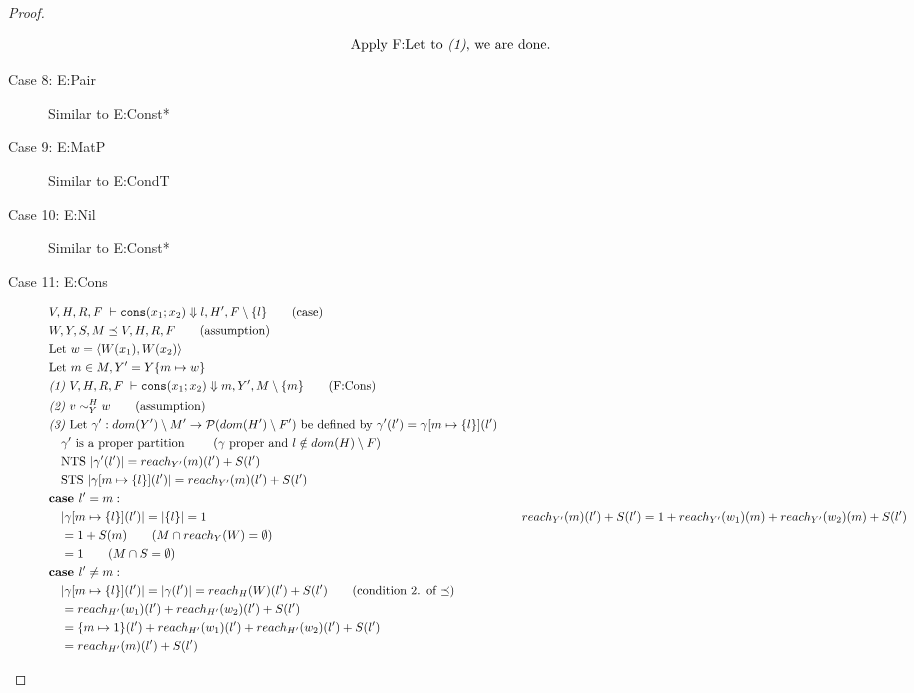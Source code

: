 \documentclass[11pt]{article}
\newcommand{\veq}[4]{#3 \sim^{#1}_{#2} #4}
\theoremstyle{definition}
\begin{document}
\begin{proof}
\begin{description}
\begin{align*}
		&\text{Apply F:Let to \emph{(1)}, we are done.}
  \end{align*}
	\item[Case 8: E:Pair]
  Similar to E:Const*
  \item[Case 9: E:MatP]
  Similar to E:CondT
  \item[Case 10: E:Nil]
  Similar to E:Const*
  \item[Case 11: E:Cons]
  \begin{align*}
		&V,H,R,F \; \vdash \consexcst{x_1}{x_2} \Downarrow l,H' ,F \setminus \{l\} \tag{case}\\
		&W,Y,S,M \preceq V,H,R,F \tag{assumption}\\
		&\text{Let } w = \pairexcst{W(x_1)}{W(x_2)}\\
		&\text{Let } m \in M, Y' = Y\{m \mapsto w\}\\
		&\emph{(1) }V,H,R,F \; \vdash
			\consexcst{x_1}{x_2} \Downarrow m,Y' ,M \setminus \{m\} \tag{F:Cons}\\
		&\emph{(2) } \veq{H}{Y}{v}{w} \tag{assumption}\\
		&\emph{(3) } \text{Let } \gamma' : dom(Y') \setminus M' \to \mathcal{P}(dom(H')\setminus F')
			\text{ be defined by } \gamma'(l') = \gamma[m \mapsto \{l\}](l')\\
		&\quad \gamma' \text{ is a proper partition } 
			\tag{$\gamma$ proper and $l \notin dom(H) \setminus F$}\\
		&\quad \text{NTS } |\gamma'(l')| = reach_{Y'}(m)(l') + S(l')\\
		&\quad \text{STS } |\gamma[m \mapsto \{l\}](l')| = 
			reach_{Y'}(m)(l') + S(l')\\
		&\textbf{case } l' = m:\\
		&\quad |\gamma[m \mapsto \{l\}](l')| = |\{l\}| = 1
		&\quad 	reach_{Y'}(m)(l') + S(l') = 1 + reach_{Y'}(w_1)(m) + reach_{Y'}(w_2)(m) + S(l')\\
		&\quad = 1 + S(m) \tag{$M \cap reach_{Y}(W) = \emptyset$}\\
		&\quad = 1 \tag{$M \cap S = \emptyset$}\\
		&\textbf{case } l' \ne m:\\
		&\quad |\gamma[m \mapsto \{l\}](l')| = |\gamma(l')| = reach_H(W)(l') + S(l') 
			\tag{condition 2. of $\preceq$}\\
		&\quad = reach_{H'}(w_1)(l') + reach_{H'}(w_2)(l') + S(l')\\
		&\quad = \{m \mapsto 1\}(l') + reach_{H'}(w_1)(l') + reach_{H'}(w_2)(l') + S(l')\\
		&\quad = reach_{H'}(m)(l') + S(l')\\

\end{align*}
\end{description}
\end{proof}
\end{document}
